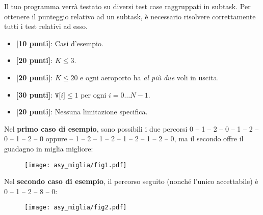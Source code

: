 \Scoring
Il tuo programma verrà testato su diversi test case raggruppati in subtask.
Per ottenere il punteggio relativo ad un subtask, è necessario risolvere
correttamente tutti i test relativi ad esso.

\begin{itemize}[nolistsep,itemsep=2mm]
  \item \textbf{ [10 punti]}: Casi d'esempio.
  \item \textbf{ [20 punti]}: $K \le 3$.
  \item \textbf{ [20 punti]}: $K \leq 20$ e ogni aeroporto ha \emph{al pi\`u due} voli in uscita.
  \item \textbf{ [30 punti]}: $\texttt{V[$i$]} \le 1$ per ogni $i=0\ldots N-1$.
  \item \textbf{ [20 punti]}: Nessuna limitazione specifica.
\end{itemize}



\Examples
\begin{example}
%
%
\end{example}


\Explanation
Nel \textbf{primo caso di esempio}, sono possibili i due percorsi 0 -- 1 -- 2 -- 0 -- 1 -- 2 -- 0 -- 1 -- 2 -- 0 oppure  -- 1 -- 2 -- 1 -- 2 -- 1 -- 2 -- 1 -- 2 -- 0, ma il secondo offre il guadagno in miglia migliore:\\[2mm]
\begin{figure}[H]%
\centering\texttt{[image: asy\_miglia/fig1.pdf]}%
\end{figure}
Nel \textbf{secondo caso di esempio}, il percorso seguito (nonch\'e l'unico accettabile) è 0 -- 1 -- 2 -- 8 -- 0:\\[2mm]
\begin{figure}[H]%
\centering\texttt{[image: asy\_miglia/fig2.pdf]}%
\end{figure}
